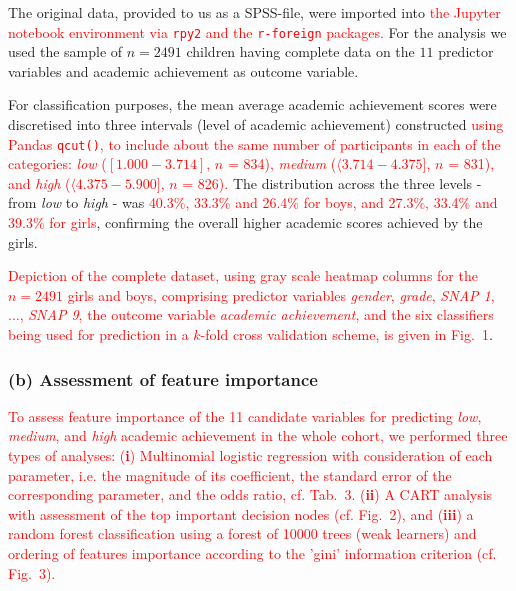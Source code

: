 \documentclass[10pt,letterpaper]{article}
\begin{document}
The original data, provided to us as a SPSS-file, were imported into \textcolor{red}{the Jupyter notebook environment via {\tt rpy2} and the {\tt r-foreign} packages.} 
For the analysis we used the sample of  $n=2491$ children having complete data 
on the $11$ predictor variables and academic achievement as outcome variable.

 For classification purposes, the mean average academic achievement scores were discretised into three intervals (level of academic achievement) constructed
 \textcolor{red}{using Pandas {\tt qcut()}, to include about the same number of participants in each of the categories:  
{\it low} ($[1.000 - 3.714]$,  $n$ = 834),
{\it medium} ($\langle 3.714 - 4.375]$, $n$ = 831), and
{\it high} ($\langle 4.375 - 5.900]$, $n$ = 826). }
The distribution across the three levels - from {\it low} to {\it high} - was 
\textcolor{red}{40.3\%, 33.3\% and 26.4\% for boys, and 27.3\%, 33.4\% and 39.3\% for girls}, 
confirming the overall higher academic scores achieved by the girls. 

\textcolor{red}{Depiction of the complete dataset,  using gray scale heatmap columns for the $n=2491$  girls and boys, comprising predictor variables {\it gender}, {\it grade}, 
{\it SNAP 1}, ..., {\it SNAP 9}, the outcome variable {\it academic achievement}, and the
 six classifiers being used for prediction in a $k$-fold cross validation scheme, is given in Fig.~1}.
 
 \subsubsection*{(b) Assessment of feature importance} 
  \textcolor{red}{To assess feature importance of the 11 candidate variables for predicting {\it low}, {\it medium}, and {\it high} academic achievement in the whole cohort,
 we performed three types of analyses: ({\bf i}) Multinomial logistic regression with consideration of each parameter, i.e. the magnitude of its coefficient, the standard error of the corresponding parameter, and the odds ratio, cf. Tab.~3. 
 ({\bf ii}) A CART analysis with assessment 
 of the top important decision nodes (cf. Fig.~2), and ({\bf iii}) a random forest classification using a forest of 10000 trees (weak learners) and ordering of features importance according
  to the 'gini' information criterion (cf. Fig.~3). }
 
\end{document}
